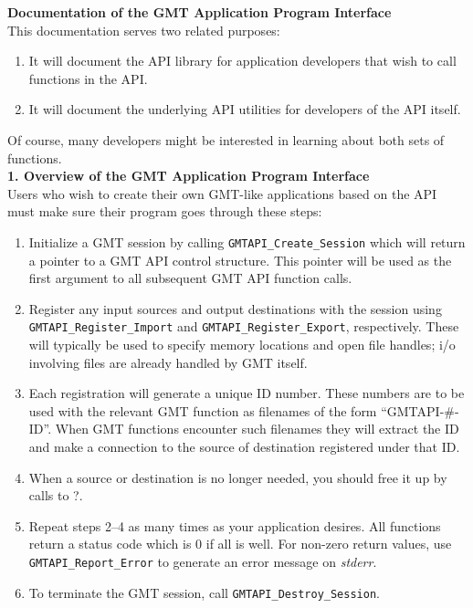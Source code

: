 \documentclass[12pt]{article}
\begin{document}
{\center \bf Documentation of the GMT Application Program Interface}\\

This documentation serves two related purposes:
\begin{enumerate}
\item It will document the API library for application developers that wish
to call functions in the API.
\item It will document the underlying API utilities for developers of
the API itself.
\end{enumerate}
Of course, many developers might be interested in learning about both sets of
functions.\\


{\bf 1. Overview of the GMT Application Program Interface}\\

Users who wish to create their own GMT-like applications based on the API
must make sure their program goes through these steps:

\begin{enumerate}
\item Initialize a GMT session by calling \texttt{GMTAPI\_Create\_Session} which
will return a pointer to a GMT API control structure.  This pointer will be used
as the first argument to all subsequent GMT API function calls.
\item Register any input sources and output destinations with the session using
\texttt{GMTAPI\_Register\_Import} and \texttt{GMTAPI\_Register\_Export}, respectively.
These will typically be used to specify memory locations and open file handles;
i/o involving files are already handled by GMT itself.
\item Each registration will generate a unique ID number.  These numbers are to be
used with the relevant GMT function as filenames of the form ``GMTAPI-\#-ID''.  When
GMT  functions encounter such filenames they will extract the ID and make a connection
to the source of destination registered under that ID.
\item When a source or destination is no longer needed, you should free it up by calls
to ?.
\item Repeat steps 2--4 as many times as your application desires.  All functions
return a status code which is 0 if all is well.  For non-zero return values, use
\texttt{GMTAPI\_Report\_Error} to generate an error message on {\it stderr}.
\item To terminate the GMT session, call \texttt{GMTAPI\_Destroy\_Session}.
\end{enumerate}
\end{document}
